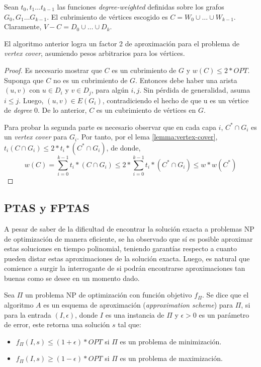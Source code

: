 \documentclass[../np-approximations.tex]{subfiles}
\begin{document}
Sean $t_0, t_1 \dots t_{k-1}$ las funciones \emph{degree-weighted} 
definidas sobre los grafos $G_0, G_1 \dots G_{k-1}$. El cubrimiento
de vértices escogido es $C = W_0 \cup \dots \cup W_{k-1}$. 
Claramente, $V-C=D_0 \cup \dots \cup D_k$.

\begin{theorem}
	El algoritmo anterior logra un factor 2 de aproximación para el
	problema de \emph{vertex cover}, asumiendo pesos arbitrarios 
	para los vértices.
\end{theorem}

\begin{proof}
	Es necesario mostrar que $C$ es un cubrimiento de $G$ y
	$w(C) \le 2*OPT$. Suponga que $C$ no es un cubrimiento de $G$.
	Entonces debe haber una arista $(u,v)$ con $u \in D_i$ y
	$v \in D_j$, para algún $i,j$. Sin pérdida de generalidad, asuma
	$i \le j$. Luego, $(u,v) \in E(G_i)$, contradiciendo el hecho de
	que u es un vértice de \emph{degree} 0. De lo anterior, $C$ es 
	un cubrimiento de vértices en $G$.
										
	Para probar la segunda parte es necesario observar que en cada
	capa $i$, $C^* \cap G_i$ es un \emph{vertex cover} para $G_i$. 
	Por tanto, por el lema \ref{lemma:vertex-cover},
	$t_i(C \cap G_i) \le 2*t_i*(C^* \cap G_i)$, de donde,
	$$w(C) = \sum_{i=0}^{k-1}t_i*(C \cap G_i) \le
	2*\sum_{i=0}^{k-1}t_i*(C^* \cap G_i) \le w*w(C^*)$$
\end{proof}

\subsection{PTAS y FPTAS}

A pesar de saber de la dificultad de encontrar la solución exacta a 
problemas NP de optimización de manera eficiente, se ha observado 
que sí es posible aproximar estas soluciones en tiempo polinomial, 
teniendo garantías respecto a cuanto pueden distar estas 
aproximaciones de la solución exacta. Luego, es natural que 
comience a surgir la interrogante de si podrán encontrarse 
aproximaciones tan buenas como se desee en un momento dado.

Sea $\Pi$ un problema NP de optimización con función objetivo
$f_{\Pi}$. Se dice que el algoritmo $A$ es un esquema de 
aproximación (\emph{approximation scheme}) para $\Pi$, si para la 
entrada $(I,\epsilon)$, donde $I$ es una instancia de $\Pi$ y 
$\epsilon > 0$ es un parámetro de error, este retorna una solución 
$s$ tal que:
\begin{itemize}
	\item $f_{\Pi}(I, s) \le (1 + \epsilon)*OPT$ si $\Pi$ es un 
	      problema de minimización.
	\item $f_{\Pi}(I, s) \ge (1 - \epsilon)*OPT$ si $\Pi$ es un 
	      problema de maximización.
\end{itemize}
\end{document}

